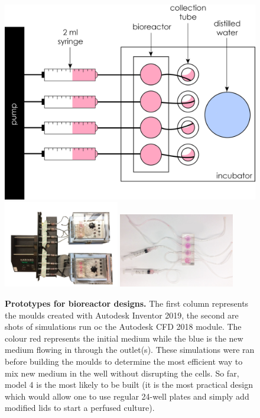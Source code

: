 \documentclass[onecolumn,10pt]{asme2ej}
\begin{document}
\begin{figure}[h]
	\includegraphics[width=\textwidth]{Figures/sketch_bio}
	\includegraphics[width=0.45\textwidth]{Figures/bioreactor}
		\includegraphics[width=0.45\textwidth]{Figures/naked-bio}
	\caption{\textbf{Prototypes for bioreactor designs.} The first column represents the moulds created with Autodesk Inventor 2019, the second are shots of simulations run oc the Autodesk CFD 2018 module. The colour red represents the initial medium while the blue is the new medium flowing in through the outlet(s). These simulations were ran before building the moulds to determine the most efficient way to mix new medium in the well without disrupting the cells. So far, model 4 is the most likely to be built (it is the most practical design which would allow one to use regular 24-well plates and simply add modified lids to start a perfused culture).}
	\label{simulations}
\end{figure}        
\end{document}
